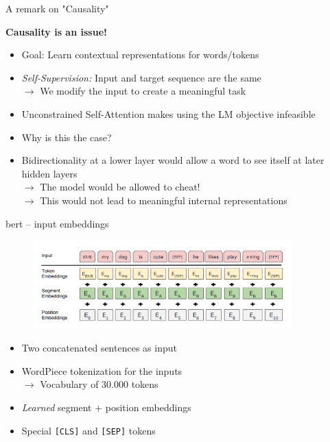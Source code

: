 
\begin{frame}{A remark on "Causality"}

\vfill

\textbf{Causality is an issue!}
	
\begin{itemize}
	\item Goal: Learn contextual representations for words/tokens
	\item \textit{Self-Supervision:} Input and target sequence are the same\\
				$\rightarrow$ We modify the input to create a meaningful task 
	\item \warning Unconstrained Self-Attention makes using the LM objective infeasible
	\item \ques Why is this the case?
	\pause
	\item[] Bidirectionality at a lower layer would allow a word to see itself at later hidden layers\\
				$\rightarrow$ The model would be allowed to cheat!\\
				$\rightarrow$ This would not lead to meaningful internal representations
\end{itemize}

\vfill

\end{frame}


\begin{frame}{bert -- input embeddings}

\vfill

\begin{figure}
	\centering
	\includegraphics[width = 10cm]{figure/bert-input.png}\\ 
\end{figure}

\begin{itemize}
	\item Two concatenated sentences as input
	\item WordPiece tokenization  for the inputs\\
			$\rightarrow$ Vocabulary of 30.000 tokens
	\item \textit{Learned} segment $+$ position embeddings
	\item Special \texttt{[CLS]} and \texttt{[SEP]} tokens
\end{itemize}

\vfill

\end{frame}

